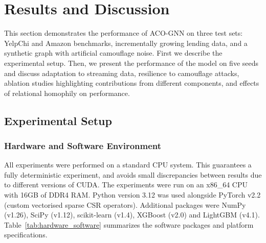 \chapter{Results and Discussion}
\label{ch:result}

This section demonstrates the performance of ACO-GNN on three test sets: YelpChi and Amazon benchmarks, incrementally growing lending data, and a synthetic graph with artificial camouflage noise. First we describe the experimental setup. Then, we present the performance of the model on five seeds and discuss adaptation to streaming data, resilience to camouflage attacks, ablation studies highlighting contributions from different components, and effects of relational homophily on performance.

\section[Experimental Setup]{Experimental Setup}
\label{sec:exp_setup}

\subsection{Hardware and Software Environment}

All experiments were performed on a standard CPU system. This guarantees a fully deterministic experiment, and avoids small discrepancies between results due to different versions of CUDA. The experiments were run on an x86\_64 CPU with 16GB of DDR4 RAM. Python version 3.12 was used alongside PyTorch v2.2 (custom vectorised sparse CSR operators). Additional packages were NumPy (v1.26), SciPy (v1.12), scikit-learn (v1.4), XGBoost (v2.0) and LightGBM (v4.1). Table~\ref{tab:hardware_software} summarizes the software packages and platform specifications.

